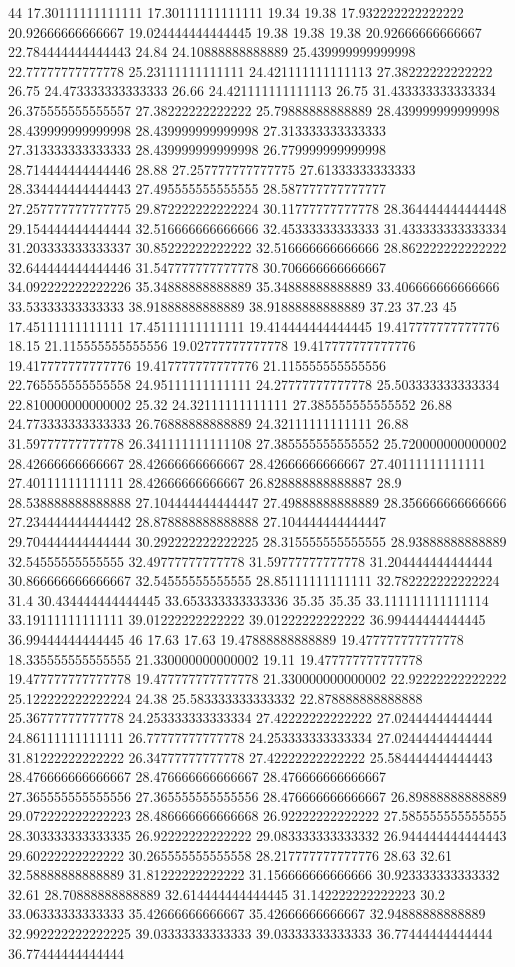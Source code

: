 44 17.30111111111111 17.30111111111111 19.34 19.38 17.932222222222222 20.92666666666667 19.024444444444445 19.38 19.38 19.38 20.92666666666667 22.784444444444443 24.84 24.10888888888889 25.439999999999998 22.77777777777778 25.23111111111111 24.421111111111113 27.38222222222222 26.75 24.473333333333333 26.66 24.421111111111113 26.75 31.433333333333334 26.375555555555557 27.38222222222222 25.79888888888889 28.439999999999998 28.439999999999998 28.439999999999998 27.313333333333333 27.313333333333333 28.439999999999998 26.779999999999998 28.714444444444446 28.88 27.257777777777775 27.61333333333333 28.334444444444443 27.495555555555555 28.587777777777777 27.257777777777775 29.872222222222224 30.11777777777778 28.364444444444448 29.154444444444444 32.516666666666666 32.45333333333333 31.433333333333334 31.203333333333337 30.85222222222222 32.516666666666666 28.862222222222222 32.644444444444446 31.547777777777778 30.706666666666667 34.092222222222226 35.34888888888889 35.34888888888889 33.406666666666666 33.53333333333333 38.91888888888889 38.91888888888889 37.23 37.23
45 17.45111111111111 17.45111111111111 19.414444444444445 19.417777777777776 18.15 21.115555555555556 19.02777777777778 19.417777777777776 19.417777777777776 19.417777777777776 21.115555555555556 22.765555555555558 24.95111111111111 24.27777777777778 25.503333333333334 22.810000000000002 25.32 24.32111111111111 27.385555555555552 26.88 24.773333333333333 26.76888888888889 24.32111111111111 26.88 31.59777777777778 26.341111111111108 27.385555555555552 25.720000000000002 28.42666666666667 28.42666666666667 28.42666666666667 27.40111111111111 27.40111111111111 28.42666666666667 26.828888888888887 28.9 28.538888888888888 27.104444444444447 27.49888888888889 28.356666666666666 27.234444444444442 28.878888888888888 27.104444444444447 29.704444444444444 30.292222222222225 28.315555555555555 28.93888888888889 32.54555555555555 32.49777777777778 31.59777777777778 31.204444444444444 30.866666666666667 32.54555555555555 28.85111111111111 32.782222222222224 31.4 30.434444444444445 33.653333333333336 35.35 35.35 33.111111111111114 33.19111111111111 39.01222222222222 39.01222222222222 36.99444444444445 36.99444444444445
46 17.63 17.63 19.47888888888889 19.477777777777778 18.335555555555555 21.330000000000002 19.11 19.477777777777778 19.477777777777778 19.477777777777778 21.330000000000002 22.92222222222222 25.122222222222224 24.38 25.583333333333332 22.878888888888888 25.36777777777778 24.253333333333334 27.42222222222222 27.02444444444444 24.86111111111111 26.77777777777778 24.253333333333334 27.02444444444444 31.81222222222222 26.34777777777778 27.42222222222222 25.584444444444443 28.476666666666667 28.476666666666667 28.476666666666667 27.365555555555556 27.365555555555556 28.476666666666667 26.89888888888889 29.072222222222223 28.486666666666668 26.92222222222222 27.585555555555555 28.303333333333335 26.92222222222222 29.083333333333332 26.944444444444443 29.60222222222222 30.265555555555558 28.217777777777776 28.63 32.61 32.58888888888889 31.81222222222222 31.156666666666666 30.923333333333332 32.61 28.70888888888889 32.614444444444445 31.142222222222223 30.2 33.06333333333333 35.42666666666667 35.42666666666667 32.94888888888889 32.992222222222225 39.03333333333333 39.03333333333333 36.77444444444444 36.77444444444444
